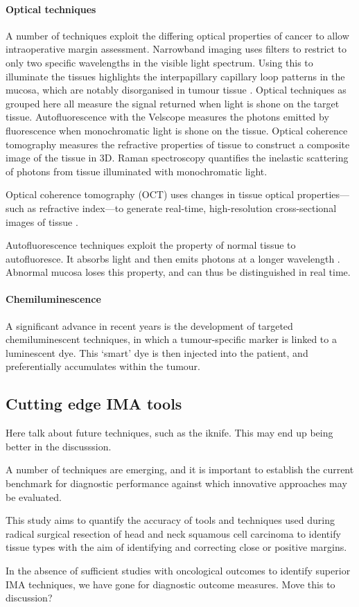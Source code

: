 \paragraph{Optical techniques}
A number of techniques exploit the differing optical properties of cancer to allow intraoperative margin assessment.
Narrowband imaging uses filters to restrict to only two specific wavelengths in the visible light spectrum.
Using this to illuminate the tissues highlights the interpapillary capillary loop patterns in the mucosa, which are notably disorganised in tumour tissue \cite{vuEfficacyNarrowBand2014}.
Optical techniques as grouped here all measure the signal returned when light is shone on the target tissue.
Autofluorescence with the Velscope measures the photons emitted by fluorescence when monochromatic light is shone on the tissue.
Optical coherence tomography measures the refractive properties of tissue to construct a composite image of the tissue in 3D.
Raman spectroscopy quantifies the inelastic scattering of photons from tissue illuminated with monochromatic light.

Optical coherence tomography (OCT) uses changes in tissue optical properties---such as refractive index---to generate real-time, high-resolution cross-sectional images of tissue \cite{heidaria.e.UseOpticalCoherence2020}.

Autofluorescence techniques exploit the property of normal tissue to autofluoresce. 
It absorbs light and then emits photons at a longer wavelength \cite{leey.-j.IntraoperativeFluorescenceGuidedSurgery2020}.
Abnormal mucosa loses this property, and can thus be distinguished in real time.

\paragraph{Chemiluminescence}

A significant advance in recent years is the development of targeted chemiluminescent techniques, in which a tumour-specific marker is linked to a luminescent dye. 
This `smart' dye is then injected into the patient, and preferentially accumulates within the tumour. 

\subsection{Cutting edge IMA tools}

Here talk about future techniques, such as the iknife. 
This may end up being better in the discusssion.

A number of techniques are emerging, and it is important to establish the current benchmark for diagnostic performance against which innovative approaches may be evaluated.

This study aims to quantify the accuracy of tools and techniques used during radical surgical resection of head and neck squamous cell carcinoma to identify tissue types with the aim of identifying and correcting close or positive margins.

In the absence of sufficient studies with oncological outcomes to identify superior IMA techniques, we have gone for diagnostic outcome measures. Move this to discussion?
